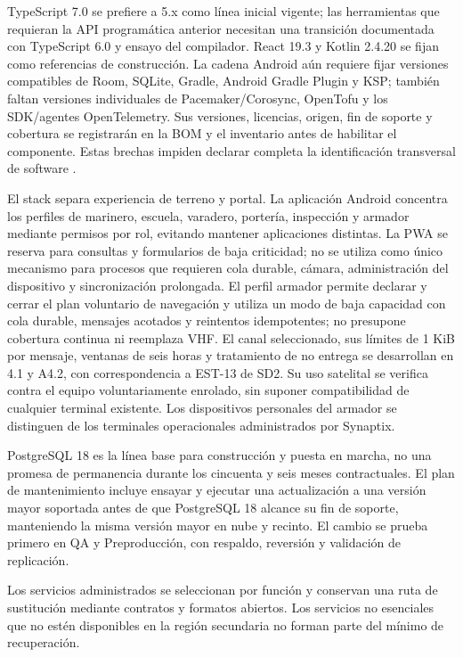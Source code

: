 TypeScript 7.0 se prefiere a 5.x como línea inicial vigente; las herramientas que requieran la API programática anterior necesitan una transición documentada con TypeScript 6.0 y ensayo del compilador. React 19.3 y Kotlin 2.4.20 se fijan como referencias de construcción. La cadena Android aún requiere fijar versiones compatibles de Room, SQLite, Gradle, Android Gradle Plugin y KSP; también faltan versiones individuales de Pacemaker/Corosync, OpenTofu y los SDK/agentes OpenTelemetry. Sus versiones, licencias, origen, fin de soporte y cobertura se registrarán en la BOM y el inventario antes de habilitar el componente. Estas brechas impiden declarar completa la identificación transversal de software \parencites{p3-typescript,p3-react,p3-kotlin}[secc.~1.6, pp.~4--5]{pucv-transversal}.

El stack separa experiencia de terreno y portal. La aplicación Android concentra los perfiles de marinero, escuela, varadero, portería, inspección y armador mediante permisos por rol, evitando mantener aplicaciones distintas. La PWA se reserva para consultas y formularios de baja criticidad; no se utiliza como único mecanismo para procesos que requieren cola durable, cámara, administración del dispositivo y sincronización prolongada. El perfil armador permite declarar y cerrar el plan voluntario de navegación y utiliza un modo de baja capacidad con cola durable, mensajes acotados y reintentos idempotentes; no presupone cobertura continua ni reemplaza VHF. El canal seleccionado, sus límites de 1 KiB por mensaje, ventanas de seis horas y tratamiento de no entrega se desarrollan en 4.1 y A4.2, con correspondencia a EST-13 de SD2. Su uso satelital se verifica contra el equipo voluntariamente enrolado, sin suponer compatibilidad de cualquier terminal existente. Los dispositivos personales del armador se distinguen de los terminales operacionales administrados por Synaptix.

PostgreSQL 18 es la línea base para construcción y puesta en marcha, no una promesa de permanencia durante los cincuenta y seis meses contractuales. El plan de mantenimiento incluye ensayar y ejecutar una actualización a una versión mayor soportada antes de que PostgreSQL 18 alcance su fin de soporte, manteniendo la misma versión mayor en nube y recinto. El cambio se prueba primero en QA y Preproducción, con respaldo, reversión y validación de replicación.

Los servicios administrados se seleccionan por función y conservan una ruta de sustitución mediante contratos y formatos abiertos. Los servicios no esenciales que no estén disponibles en la región secundaria no forman parte del mínimo de recuperación.

